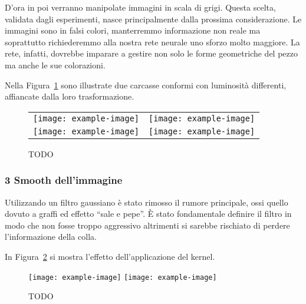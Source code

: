D'ora in poi verranno manipolate immagini in scala di grigi.
Questa scelta, validata dagli esperimenti, nasce principalmente dalla prossima considerazione.
Le immagini sono in falsi colori, manterremmo informazione non reale ma soprattutto richiederemmo alla nostra rete neurale uno sforzo molto maggiore.
La rete, infatti, dovrebbe imparare a gestire non solo le forme geometriche del pezzo ma anche le sue colorazioni.

Nella Figura~\ref{fig:equalizzazione} sono illustrate due carcasse conformi con luminosità differenti, affiancate dalla loro trasformazione.
\begin{figure}[ht] %
  \begin{center}
    \begin{tabular}{cc}
      \texttt{[image: example-image]} &
      \texttt{[image: example-image]} \\
      \texttt{[image: example-image]} &
      \texttt{[image: example-image]}
    \end{tabular}
    \caption{TODO}
    \label{fig:equalizzazione}
  \end{center}
\end{figure}


\subsubsection{3 Smooth dell'immagine}
Utilizzando un filtro gaussiano è stato rimosso il rumore principale, ossi quello dovuto a graffi ed effetto ``sale e pepe''.
È stato fondamentale definire il filtro in modo che non fosse troppo aggressivo altrimenti si sarebbe rischiato di perdere l'informazione della colla.

In Figura~\ref{fig:smooth} si mostra l'effetto dell'applicazione del kernel.
\begin{figure}[ht] %
  \begin{center}
    \texttt{[image: example-image]}
    \texttt{[image: example-image]}
    \caption{TODO}
    \label{fig:smooth}
  \end{center}
\end{figure}

